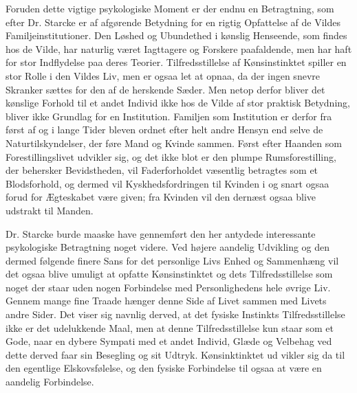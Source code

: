 \documentclass[12pt,a4paper,openany]{book}
\newcommand{\opage}[1]{\marginnote{\footnotesize\textit{[#1]}}}
\begin{document}
Foruden dette vigtige psykologiske Moment er der endnu
en Betragtning, som efter Dr. Starcke er af afgørende Betydning
for en rigtig Opfattelse af de Vildes Familjeinstitutioner. Den
Løshed og Ubundethed i kønslig Henseende, som findes hos de
Vilde, har naturlig været Iagttagere og Forskere paafaldende, men
har haft for stor Indflydelse paa deres Teorier. Tilfredsstillelse
af Kønsinstinktet spiller en stor Rolle i den Vildes Liv, men er
ogsaa let at opnaa, da der ingen snevre Skranker sættes for den
af de herskende Sæder. Men netop derfor bliver det kønslige
Forhold til et andet Individ ikke hos de Vilde af stor praktisk
Betydning, bliver ikke Grundlag for en Institution. Familjen som
Institution er derfor fra først af og i lange Tider bleven ordnet
efter helt andre Hensyn end selve de Naturtilskyndelser, der føre
Mand og Kvinde sammen. Først efter Haanden som Forestillingslivet
udvikler sig, og det ikke blot er den plumpe Rumsforestilling,
der behersker Bevidstheden, vil Faderforholdet væsentlig betragtes
som et Blodsforhold, og dermed vil Kyskhedsfordringen til Kvinden
i og snart ogsaa forud for Ægteskabet være given; fra Kvinden
vil den dernæst ogsaa blive udstrakt til Manden.

Dr. Starcke burde maaske have gennemført den her antydede
interessante psykologiske Betragtning noget videre. Ved
højere aandelig Udvikling og den dermed følgende finere Sans for
det personlige Livs Enhed og Sammenhæng vil det ogsaa blive
umuligt at opfatte Kønsinstinktet og dets Tilfredsstillelse som noget
der staar uden nogen Forbindelse med Personlighedens hele øvrige
Liv. Gennem mange fine Traade hænger denne Side af Livet
sammen med Livets andre Sider. Det viser sig navnlig derved,
at det fysiske Instinkts Tilfredsstillelse ikke er det udelukkende
Maal, men at denne Tilfredsstillelse kun staar som et Gode, naar
en dybere Sympati med et andet Individ, Glæde og Velbehag ved
dette derved faar sin Besegling og sit Udtryk. Kønsinktinktet ud%
\opage{793}vikler sig da til den egentlige Elskovsfølelse, og den fysiske Forbindelse
til ogsaa at være en aandelig Forbindelse.
\end{document}
